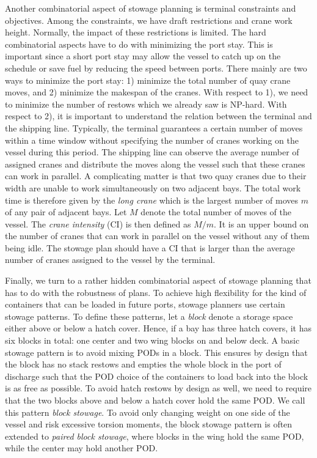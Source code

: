 \documentclass[preprint,12pt,authoryear]{elsarticle}
\begin{document}
Another combinatorial aspect of stowage planning is terminal constraints and objectives. Among the constraints, we have draft restrictions and crane work height. Normally, the impact of these restrictions is limited. The hard combinatorial aspects have to do with minimizing the port stay. This is important since a short port stay may allow the vessel to catch up on the schedule or save fuel by reducing the speed between ports. There mainly are two ways to minimize the port stay: 1) minimize the total number of quay crane moves, and 2) minimize the makespan of the cranes. With respect to  1), we need to minimize the number of restows which we already saw is NP-hard. With respect to 2), it is important to understand the relation between the terminal and the shipping line. Typically, the terminal guarantees a certain number of moves within a time window without specifying the number of cranes working on the vessel during this period. The shipping line can observe the average number of assigned cranes and distribute the moves along the vessel such that these cranes can work in parallel.  A complicating matter is that two quay cranes due to their width are unable to work simultaneously on two adjacent bays. The total work time is therefore given by the {\em long crane} which is the largest number of moves $m$ of any pair of adjacent bays. Let $M$ denote the total number of moves of the vessel. The {\em crane intensity} (CI) is then defined as $M / m$. It is an upper bound on the number of cranes that can work in parallel on the vessel without any of them being idle. The stowage plan should have a CI that is larger than the average number of cranes assigned to the vessel by the terminal.  

Finally, we turn to a rather hidden combinatorial aspect of stowage planning that has to do with the robustness of plans. To achieve high flexibility for the kind of containers that can be loaded in future ports, stowage planners use certain stowage patterns. To define these patterns, let a {\em block} denote a storage space either above or below a hatch cover. Hence, if a bay has three hatch covers, it has six blocks in total: one center and two wing blocks on and below deck. A basic stowage pattern is to avoid mixing PODs in a block. This ensures by design that the block has no stack restows and empties the whole block in the port of discharge such that the POD choice of the containers to load back into the block is as free as possible. To avoid hatch restows by design as well, we need to require that the two blocks above and below a hatch cover hold the same POD. We call this pattern {\em block stowage}. To avoid only changing weight on one side of the vessel and risk excessive torsion moments, the block stowage pattern is often extended to {\em paired block stowage}, where blocks in the wing hold the same POD, while the center may hold another POD. 
\end{document}
